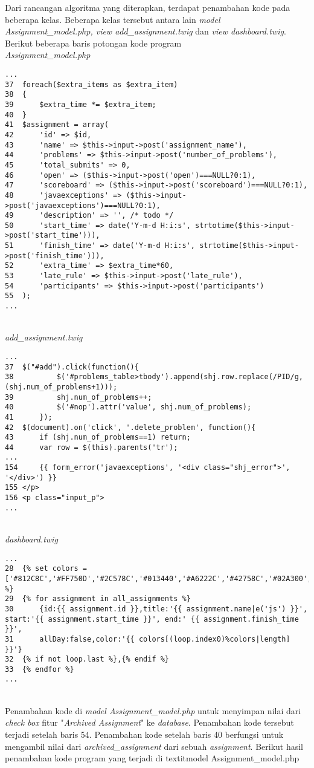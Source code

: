 Dari rancangan algoritma yang diterapkan, terdapat penambahan kode pada beberapa kelas. Beberapa kelas tersebut antara lain \textit{model Assignment\_model.php, view add\_assignment.twig} dan \textit{view dashboard.twig}.
Berikut beberapa baris potongan kode program
~\\
\textit{Assignment\_model.php}
\begin{lstlisting}[basicstyle=\ttfamily, frame=single,
columns=fullflexible, keepspaces=true, breaklines=true]
...
37	foreach($extra_items as $extra_item)
38	{
39		$extra_time *= $extra_item;
40	}
41	$assignment = array(
42		'id' => $id,
43		'name' => $this->input->post('assignment_name'),
44		'problems' => $this->input->post('number_of_problems'),
45		'total_submits' => 0,
46		'open' => ($this->input->post('open')===NULL?0:1),
47		'scoreboard' => ($this->input->post('scoreboard')===NULL?0:1),
48		'javaexceptions' => ($this->input->post('javaexceptions')===NULL?0:1),
49		'description' => '', /* todo */
50		'start_time' => date('Y-m-d H:i:s', strtotime($this->input->post('start_time'))),
51		'finish_time' => date('Y-m-d H:i:s', strtotime($this->input->post('finish_time'))),
52		'extra_time' => $extra_time*60,
53		'late_rule' => $this->input->post('late_rule'),
54		'participants' => $this->input->post('participants')
55	);
...
\end{lstlisting}
~\\
\textit{add\_assignment.twig}
\begin{lstlisting}[basicstyle=\ttfamily, frame=single,
columns=fullflexible, keepspaces=true, breaklines=true]
...
37	$("#add").click(function(){
38			$('#problems_table>tbody').append(shj.row.replace(/PID/g, (shj.num_of_problems+1)));
39			shj.num_of_problems++;
40			$('#nop').attr('value', shj.num_of_problems);
41		});
42	$(document).on('click', '.delete_problem', function(){
43		if (shj.num_of_problems==1) return;
44		var row = $(this).parents('tr');
...
154		{{ form_error('javaexceptions', '<div class="shj_error">', '</div>') }}
155	</p>
156	<p class="input_p">
...
\end{lstlisting}
~\\
\textit{dashboard.twig}
\begin{lstlisting}[basicstyle=\ttfamily, frame=single,
columns=fullflexible, keepspaces=true, breaklines=true]
...
28	{% set colors = ['#812C8C','#FF750D','#2C578C','#013440','#A6222C','#42758C','#02A300','#BA6900'] %}
29	{% for assignment in all_assignments %}
30		{id:{{ assignment.id }},title:'{{ assignment.name|e('js') }}', start:'{{ assignment.start_time }}', end:' {{ assignment.finish_time }}',
31		allDay:false,color:'{{ colors[(loop.index0)%colors|length] }}'}
32	{% if not loop.last %},{% endif %}
33	{% endfor %}
...
\end{lstlisting}
~\\
Penambahan kode di \textit{model Assignment\_model.php} untuk menyimpan nilai dari \textit{check box} fitur "\textit{Archived Assignment}" ke \textit{database}. Penambahan kode tersebut terjadi setelah baris 54. Penambahan kode setelah baris 40 berfungsi untuk mengambil nilai dari \textit{archived\_assignment} dari sebuah \textit{assignment}. Berikut hasil penambahan kode program yang terjadi di textit{model Assignment\_model.php} 

